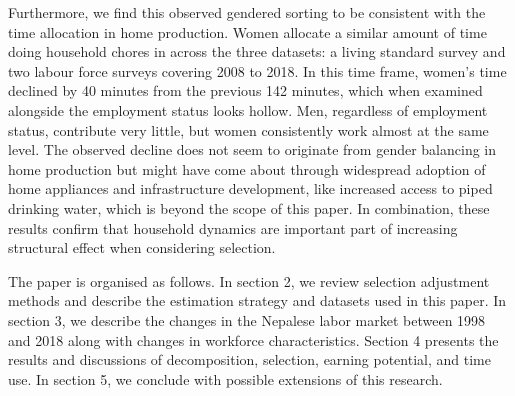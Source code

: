 Furthermore, we find this observed gendered sorting to be consistent with the time allocation in home production. Women allocate a similar amount of time doing household chores in across the three datasets: a living standard survey and two labour force surveys covering 2008 to 2018. In this time frame, women’s time declined by 40 minutes from the previous 142 minutes, which when examined alongside the employment status looks hollow. Men, regardless of employment status, contribute very little, but women consistently work almost at the same level. The observed decline does not seem to originate from gender balancing in home production but might have come about through widespread adoption of home appliances and infrastructure development, like increased access to piped drinking water, which is beyond the scope of this paper. In combination, these results confirm that household dynamics are important part of increasing structural effect when considering selection.\par

The paper is organised as follows. In section 2, we review selection adjustment methods and describe the estimation strategy and datasets used in this paper. In section 3, we describe the changes in the Nepalese labor market between 1998 and 2018 along with changes in workforce characteristics. Section 4 presents the results and discussions of decomposition, selection, earning potential, and time use. In section 5, we conclude with possible extensions of this research.\par                                                                                                                                                                                                                                                        

